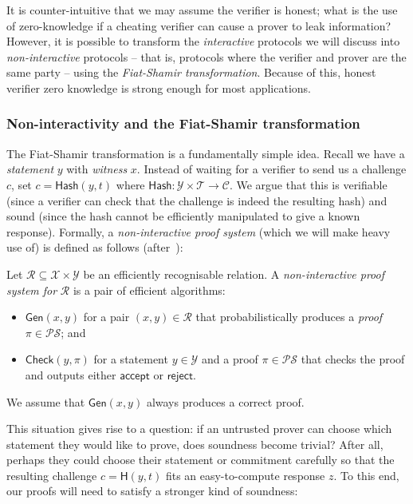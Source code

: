 \documentclass[12pt,a4paper]{article}
\theoremstyle{definition}
\begin{document}
It is counter-intuitive that we may assume the verifier is honest; what is the use of zero-knowledge if a cheating verifier can cause a prover to leak information? However, it is possible to transform the \textit{interactive} protocols we will discuss into \textit{non-interactive} protocols -- that is, protocols where the verifier and prover are the same party -- using the \textit{Fiat-Shamir transformation}. Because of this, honest verifier zero knowledge is strong enough for most applications.

\subsubsection{Non-interactivity and the Fiat-Shamir transformation}
The Fiat-Shamir transformation is a fundamentally simple idea. Recall we have a \textit{statement} $y$ with \textit{witness} $x$. Instead of waiting for a verifier to send us a challenge $c$, set $c = \mathsf{Hash}(y, t)$ where $\mathsf{Hash}:\mathcal{Y}\times\mathcal{T}\rightarrow\mathcal{C}$. We argue that this is verifiable (since a verifier can check that the challenge is indeed the resulting hash) and sound (since the hash cannot be efficiently manipulated to give a known response). Formally, a \textit{non-interactive proof system} (which we will make heavy use of) is defined as follows (after~\cite{boneh2020graduate}):

\begin{definition}
    Let $\mathcal{R}\subseteq\mathcal{X}\times\mathcal{Y}$ be an efficiently recognisable relation. A \textit{non-interactive proof system for} $\mathcal{R}$ is a pair of efficient algorithms:
    \begin{itemize}
        \item $\mathsf{Gen}(x, y)$ for a pair $(x, y)\in\mathcal{R}$ that probabilistically produces a \textit{proof} $\pi\in\mathcal{PS}$; and
        \item $\mathsf{Check}(y, \pi)$ for a statement $y\in\mathcal{Y}$ and a proof $\pi\in\mathcal{PS}$ that checks the proof and outputs either $\mathsf{accept}$ or $\mathsf{reject}$.
    \end{itemize}
    We assume that $\mathsf{Gen}(x, y)$ always produces a correct proof.
\end{definition}
This situation gives rise to a question: if an untrusted prover can choose which statement they would like to prove, does soundness become trivial? After all, perhaps they could choose their statement or commitment carefully so that the resulting challenge $c = \mathsf{H}(y, t)$ fits an easy-to-compute response $z$. To this end, our proofs will need to satisfy a stronger kind of soundness:
\end{document}
